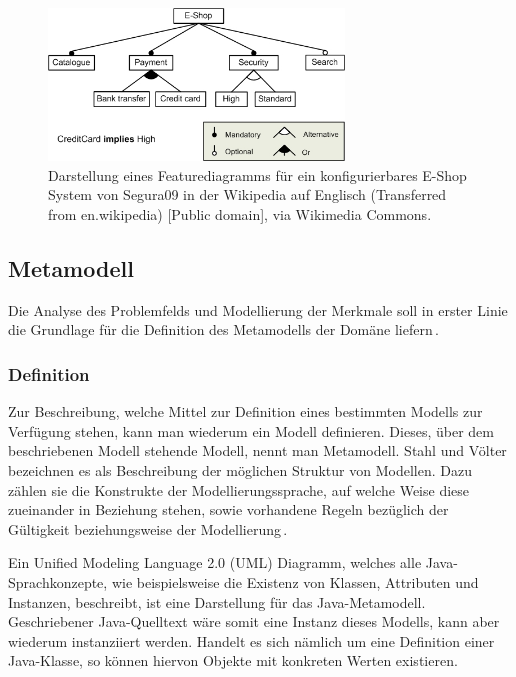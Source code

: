 \documentclass[12pt,oneside,a4paper,parskip]{scrbook}
\begin{document}
\begin{figure}[tbp]
\centering
\includegraphics[width=0.7\textwidth]{bilder/E-shopFM.jpg}
\caption{Darstellung eines Featurediagramms für ein konfigurierbares E-Shop System von Segura09 in der Wikipedia auf Englisch (Transferred from en.wikipedia) [Public domain], via Wikimedia Commons.}
\label{fig:fd}
\end{figure}

\subsection{Metamodell}

Die Analyse des Problemfelds und Modellierung der Merkmale soll in erster Linie die Grundlage für die Definition des Metamodells der Domäne liefern\,\cite[S.\,200]{stahl2007}.

\subsubsection{Definition}

Zur Beschreibung, welche Mittel zur Definition eines bestimmten Modells zur Verfügung stehen, kann man wiederum ein Modell definieren. Dieses, über dem beschriebenen Modell stehende Modell, nennt man Metamodell. Stahl und Völter bezeichnen es als Beschreibung der möglichen Struktur von Modellen. Dazu zählen sie die Konstrukte der Modellierungssprache, auf welche Weise diese zueinander in Beziehung stehen, sowie vorhandene Regeln bezüglich der Gültigkeit beziehungsweise der Modellierung\,\cite[S.\,59]{stahl2007}.

Ein Unified Modeling Language 2.0 (UML) Diagramm, welches alle Java-Sprachkonzepte, wie beispielsweise die Existenz von Klassen, Attributen und Instanzen, beschreibt, ist eine Darstellung für das Java-Metamodell. Geschriebener Java-Quelltext wäre somit eine Instanz dieses Modells, kann aber wiederum instanziiert werden. Handelt es sich nämlich um eine Definition einer Java-Klasse, so können hiervon Objekte mit konkreten Werten existieren.
\end{document}
